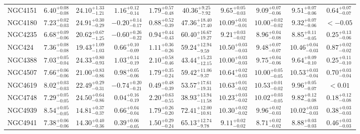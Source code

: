 \documentclass[onecolumn]{mn2e}
\begin{document}
\begin{landscape}
{\begin{center}
\begin{longtable}{lccccccccc}
NGC4151 & $6.40_{-0.08}^{+0.08}$ & $24.10_{-1.21}^{+1.33}$ & $1.16_{-0.14}^{+0.12}$ & $1.79_{-0.48}^{+0.57}$ &$40.36_{-7.92}^{+9.25}$ & $9.65_{-0.03}^{+0.05}$ & $9.09_{-0.06}^{+0.07}$ & $9.51_{-0.06}^{+0.07}$ & $0.64_{-0.07}^{+0.07}$ \\
NGC4180 & $7.23_{-0.03}^{+0.02}$ & $24.91_{-0.29}^{+0.30}$ & $-0.20_{-0.17}^{+0.14}$ & $0.88_{-0.39}^{+0.52}$ &$47.36_{-17.40}^{+18.40}$ & $10.09_{-0.01}^{+0.01}$ & $10.00_{-0.02}^{+0.02}$ & $9.32_{-0.06}^{+0.07}$ & $<-0.05$ \\
NGC4235 & $6.68_{-0.06}^{+0.09}$ & $20.62_{-1.25}^{+0.67}$ & $-0.60_{-0.22}^{+0.26}$ & $0.94_{-0.43}^{+0.44}$ &$60.40_{-19.27}^{+16.67}$ & $9.21_{-0.02}^{+0.03}$ & $8.96_{-0.08}^{+0.04}$ & $8.85_{-0.05}^{+0.11}$ & $0.25_{-0.06}^{+0.13}$ \\
NGC424 & $7.36_{-0.08}^{+0.08}$ & $19.43_{-1.03}^{+1.09}$ & $0.66_{-0.09}^{+0.10}$ & $1.11_{-0.26}^{+0.36}$ &$59.24_{-9.59}^{+12.94}$ & $10.50_{-0.03}^{+0.03}$ & $9.48_{-0.07}^{+0.07}$ & $10.46_{-0.03}^{+0.04}$ & $0.87_{-0.02}^{+0.02}$ \\
NGC4388 & $7.03_{-0.04}^{+0.05}$ & $24.33_{-0.93}^{+0.80}$ & $1.03_{-0.19}^{+0.14}$ & $2.10_{-0.46}^{+0.58}$ &$43.44_{-12.15}^{+15.23}$ & $10.00_{-0.03}^{+0.03}$ & $9.75_{-0.06}^{+0.04}$ & $9.64_{-0.10}^{+0.09}$ & $0.25_{-0.10}^{+0.11}$ \\
NGC4507 & $7.66_{-0.06}^{+0.06}$ & $21.00_{-0.86}^{+0.83}$ & $0.98_{-0.06}^{+0.05}$ & $1.79_{-0.24}^{+0.35}$ &$59.42_{-9.37}^{+11.06}$ & $10.64_{-0.03}^{+0.02}$ & $10.00_{-0.05}^{+0.05}$ & $10.53_{-0.04}^{+0.03}$ & $0.70_{-0.04}^{+0.03}$ \\
NGC4619 & $8.02_{-0.03}^{+0.03}$ & $22.49_{-0.31}^{+0.29}$ & $-0.74_{-0.21}^{+0.20}$ & $0.49_{-0.39}^{+0.48}$ &$53.57_{-19.31}^{+17.61}$ & $10.63_{-0.02}^{+0.01}$ & $10.53_{-0.02}^{+0.01}$ & $9.96_{-0.07}^{+0.05}$ & $<0.01$ \\
NGC4748 & $7.29_{-0.05}^{+0.05}$ & $24.50_{-0.86}^{+0.64}$ & $0.04_{-0.19}^{+0.16}$ & $2.20_{-0.55}^{+0.63}$ &$38.93_{-11.58}^{+13.94}$ & $10.23_{-0.02}^{+0.03}$ & $10.02_{-0.05}^{+0.03}$ & $9.82_{-0.08}^{+0.12}$ & $0.18_{-0.08}^{+0.12}$ \\
NGC4939 & $8.54_{-0.05}^{+0.05}$ & $14.81_{-0.37}^{+0.37}$ & $0.66_{-0.04}^{+0.04}$ & $1.79_{-0.20}^{+0.26}$ &$72.41_{-10.81}^{+12.00}$ & $10.30_{-0.02}^{+0.02}$ & $9.96_{-0.03}^{+0.02}$ & $10.02_{-0.03}^{+0.03}$ & $0.38_{-0.03}^{+0.03}$ \\
NGC4941 & $7.38_{-0.06}^{+0.06}$ & $14.30_{-0.36}^{+0.40}$ & $0.39_{-0.05}^{+0.06}$ & $1.50_{-0.24}^{+0.29}$ &$65.13_{-9.78}^{+12.74}$ & $9.11_{-0.02}^{+0.02}$ & $8.71_{-0.02}^{+0.02}$ & $8.88_{-0.03}^{+0.03}$ & $0.46_{-0.03}^{+0.03}$ \\

\end{longtable}
\end{center}}
\end{landscape}
\end{document}

